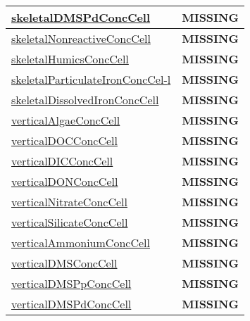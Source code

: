 {\begin{center}
\begin{longtable}{| p{2.0in} | p{4.0in} |}
    \hline
    \hyperref[subsec:var_sec_tracers_aggregate_skeletalDMSPdConcCell]{skeletalDMSPdConcCell} & {\bf \color{red} MISSING} \\
    \hline
    \hyperref[subsec:var_sec_tracers_aggregate_skeletalNonreactiveConcCell]{skeletalNonreactiveConcCell} & {\bf \color{red} MISSING} \\
    \hline
    \hyperref[subsec:var_sec_tracers_aggregate_skeletalHumicsConcCell]{skeletalHumicsConcCell} & {\bf \color{red} MISSING} \\
    \hline
    \hyperref[subsec:var_sec_tracers_aggregate_skeletalParticulateIronConcCell]{skeletalParticulateIronConcCel-}\hyperref[subsec:var_sec_tracers_aggregate_skeletalParticulateIronConcCell]{l  }& {\bf \color{red} MISSING} \\
    \hline
    \hyperref[subsec:var_sec_tracers_aggregate_skeletalDissolvedIronConcCell]{skeletalDissolvedIronConcCell} & {\bf \color{red} MISSING} \\
    \hline
    \hyperref[subsec:var_sec_tracers_aggregate_verticalAlgaeConcCell]{verticalAlgaeConcCell} & {\bf \color{red} MISSING} \\
    \hline
    \hyperref[subsec:var_sec_tracers_aggregate_verticalDOCConcCell]{verticalDOCConcCell} & {\bf \color{red} MISSING} \\
    \hline
    \hyperref[subsec:var_sec_tracers_aggregate_verticalDICConcCell]{verticalDICConcCell} & {\bf \color{red} MISSING} \\
    \hline
    \hyperref[subsec:var_sec_tracers_aggregate_verticalDONConcCell]{verticalDONConcCell} & {\bf \color{red} MISSING} \\
    \hline
    \hyperref[subsec:var_sec_tracers_aggregate_verticalNitrateConcCell]{verticalNitrateConcCell} & {\bf \color{red} MISSING} \\
    \hline
    \hyperref[subsec:var_sec_tracers_aggregate_verticalSilicateConcCell]{verticalSilicateConcCell} & {\bf \color{red} MISSING} \\
    \hline
    \hyperref[subsec:var_sec_tracers_aggregate_verticalAmmoniumConcCell]{verticalAmmoniumConcCell} & {\bf \color{red} MISSING} \\
    \hline
    \hyperref[subsec:var_sec_tracers_aggregate_verticalDMSConcCell]{verticalDMSConcCell} & {\bf \color{red} MISSING} \\
    \hline
    \hyperref[subsec:var_sec_tracers_aggregate_verticalDMSPpConcCell]{verticalDMSPpConcCell} & {\bf \color{red} MISSING} \\
    \hline
    \hyperref[subsec:var_sec_tracers_aggregate_verticalDMSPdConcCell]{verticalDMSPdConcCell} & {\bf \color{red} MISSING} \\

\end{longtable}
\end{center}}
